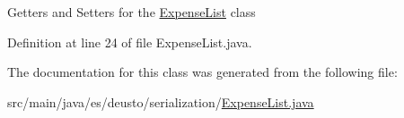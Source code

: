 Getters and Setters for the \hyperlink{classes_1_1deusto_1_1serialization_1_1_expense_list}{Expense\+List} class 

Definition at line 24 of file Expense\+List.\+java.



The documentation for this class was generated from the following file\+:\begin{DoxyCompactItemize}
\item 
src/main/java/es/deusto/serialization/\hyperlink{_expense_list_8java}{Expense\+List.\+java}\end{DoxyCompactItemize}
